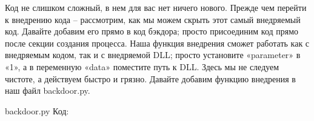 \documentclass[12pt]{book}
\begin{document}

Код не слишком сложный, в нем для вас нет ничего нового. Прежде чем перейти к внедрению кода – рассмотрим, как мы можем скрыть этот самый внедряемый код. Давайте добавим его прямо в код бэкдора; просто присоединим код прямо после секции создания процесса. Наша функция внедрения сможет работать как с внедряемым кодом, так и с внедряемой DLL; просто установите «parameter» в «1», а в переменную «data» поместите путь к DLL. Здесь мы не следуем чистоте, а действуем быстро и грязно. Давайте добавим функцию внедрения в наш файл backdoor.py.

backdoor.py
Код:




    

\end{document}
